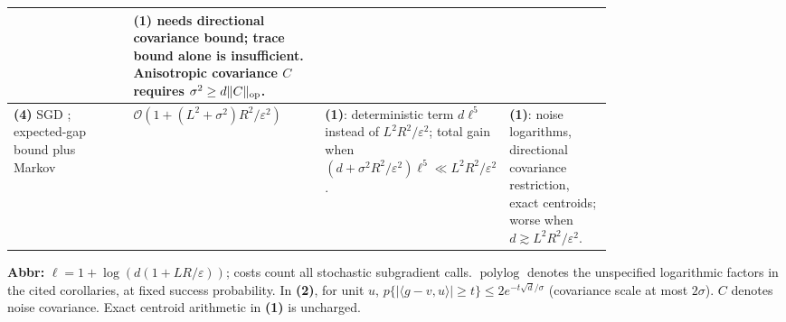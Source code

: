 \begin{table}[tp]
\begin{threeparttable}
\begin{tabularx}{\linewidth}{@{}>{\raggedright\arraybackslash}p{0.20\linewidth}>{\raggedright\arraybackslash}p{0.32\linewidth}>{\raggedright\arraybackslash}p{0.25\linewidth}>{\raggedright\arraybackslash}X@{}}
& \textbf{(1)} needs directional covariance bound; trace bound alone is insufficient. Anisotropic covariance $C$ requires $\sigma^2\ge d\|C\|_{\rm op}$. \\
\midrule
\textbf{(4)} SGD \citep[\S1, v1]{covMOSZ2025v1}; expected-gap bound plus Markov
& $\mathcal{O}(1+(L^2+\sigma^2)R^2/\varepsilon^2)$
& \textbf{(1)}: deterministic term $d\ell^5$ instead of $L^2R^2/\varepsilon^2$; total gain when $(d+\sigma^2R^2/\varepsilon^2)\ell^5\ll L^2R^2/\varepsilon^2$.
& \textbf{(1)}: noise logarithms, directional covariance restriction, exact centroids; worse when $d\gtrsim L^2R^2/\varepsilon^2$. \\
\bottomrule
\end{tabularx}
\begin{tablenotes}[flushleft]\footnotesize
\item[] \textbf{Abbr:} $\ell=1+\log(d(1+LR/\varepsilon))$; costs count all stochastic subgradient calls. $\operatorname{polylog}$ denotes the unspecified logarithmic factors in the cited corollaries, at fixed success probability. In \textbf{(2)}, for unit $u$, $p\{|\langle g-v,u\rangle|\ge t\}\le2e^{-t\sqrt d/\sigma}$ (covariance scale at most $2\sigma$). $C$ denotes noise covariance. Exact centroid arithmetic in \textbf{(1)} is uncharged.
\end{tablenotes}
\end{threeparttable}
\end{table}
\clearpage
